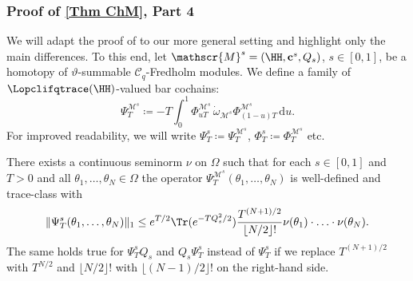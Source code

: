 \documentclass[a4paper, english, 12pt, bibliography=totocnumbered,
index=totoc]{scrartcl}
\begin{document}
\subsubsection{Proof of \texorpdfstring{\cref{Thm ChM}}{Theorem 5.10}, Part
4}
We will adapt the proof of \cite[Theorem 6.2]{GüneysuLudewig} to
our more general setting and highlight only the main differences.
To this end, let $\mathscr{M}^s = (\HH, \mathbf{c}^s, Q_s)$, $s\in [0,1]$, be
a homotopy of $\vartheta$-summable $\mathcal{C}_q$-Fredholm modules.
We define a family of
$\Lopclifqtrace(\HH)$-valued bar
cochains:
\begin{equation*}
	\Psi_T^{\mathscr{M}^s} \coloneqq -T\int_0^1
	{\Phi}_{uT}^{\mathscr{M}^s}\, \dot{\omega}_{\mathscr{M}^s}
	{\Phi}_{(1-u)T}^{\mathscr{M}^s} \,\mathrm{d} u.
\end{equation*}
For improved readability, we will write $\Psi^s_T \coloneqq
\Psi_T^{\mathscr{M}^s}$, $\Phi_T^s \coloneqq
\Phi_T^{\mathscr{M}^s}$ etc.
\begin{lem}
	There exists a continuous seminorm $\nu$ on $\Omega$ such that for each
	$s \in [0,1]$ and $T > 0$ and all $\theta_1, \ldots, \theta_N \in \Omega$
	the operator $\Psi_T^{\mathscr{M}^s}(\theta_1, \ldots, \theta_N)$ is
	well-defined and trace-class with
	\begin{equation}\label{Estimate Psi}
		\lVert \Psi_T^s(\theta_1, \ldots, \theta_N) \rVert_1 \leq e^{T/2}
		\Tr(e^{-TQ_s^2/2}) \dfrac{T^{(N+1)/2}}{\lfloor N/2 \rfloor !}
		\nu(\theta_1) \cdot
		\ldots \cdot \nu(\theta_N).
	\end{equation}
	The same holds true for $\Psi_T^sQ_s$ and $Q_s \Psi_T^s$ instead
	of $\Psi_T^s$ if we replace
	$T^{(N+1)/2}$ with $T^{N/2}$ and $\lfloor N/2\rfloor!$ with $\lfloor
	(N-1)/2 \rfloor!$ on the right-hand side.
\end{lem}
\end{document}
